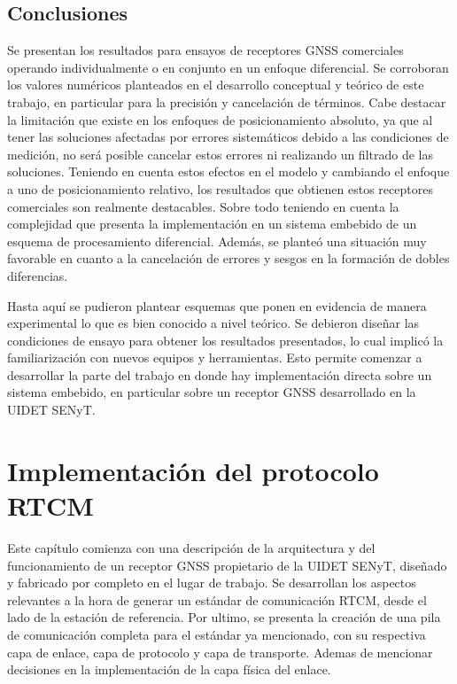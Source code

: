 \documentclass[a4paper,12pt,oneside,onecolumn,final,openright]{book}%
\begin{document}
\section{Conclusiones}
	Se presentan los resultados para ensayos de receptores GNSS comerciales operando individualmente o en conjunto en un enfoque diferencial. Se corroboran los valores numéricos planteados en el desarrollo conceptual y teórico de este trabajo, en particular para la precisión y cancelación de términos. Cabe destacar la limitación que existe en los enfoques de posicionamiento absoluto, ya que al tener las soluciones afectadas por errores sistemáticos debido a las condiciones de medición, no será posible cancelar estos errores ni realizando un filtrado de las soluciones. Teniendo en cuenta estos efectos en el modelo y cambiando el enfoque a uno de posicionamiento relativo, los resultados que obtienen estos receptores comerciales son realmente destacables. Sobre todo teniendo en cuenta la complejidad que presenta la implementación en un sistema embebido de un esquema de procesamiento diferencial. Además, se planteó una situación muy favorable en cuanto a la cancelación de errores y sesgos en la formación de dobles diferencias.
	
	Hasta aquí se pudieron plantear esquemas que ponen en evidencia de manera experimental lo que es bien conocido a nivel teórico. Se debieron diseñar las condiciones de ensayo para obtener los resultados presentados, lo cual implicó la familiarización con nuevos equipos y herramientas. Esto permite comenzar a desarrollar la parte del trabajo en donde hay implementación directa sobre un sistema embebido, en particular sobre un receptor GNSS desarrollado en la UIDET SENyT.

\chapter{Implementación del protocolo RTCM}\label{ch:Qseries}
	Este capítulo comienza con una descripción de la arquitectura y del funcionamiento de un receptor GNSS propietario de la UIDET SENyT, diseñado y fabricado por completo en el lugar de trabajo. Se desarrollan los aspectos relevantes a la hora de generar un estándar de comunicación RTCM, desde el lado de la estación de referencia. Por ultimo, se presenta la creación de una pila de comunicación completa para el estándar ya mencionado, con su respectiva capa de enlace, capa de protocolo y capa de transporte. Ademas de mencionar decisiones en la implementación de la capa física del enlace.
\end{document}
